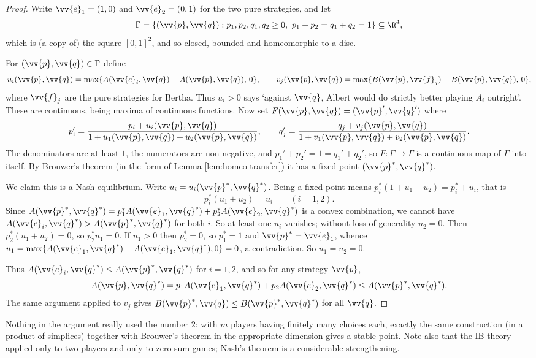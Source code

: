 \begin{proof}
	Write $\vv{e}_1 = (1,0)$ and $\vv{e}_2 = (0,1)$ for the two pure strategies, and let
	$$\Gamma = \{(\vv{p},\vv{q}) : p_1,p_2,q_1,q_2\geq 0,\ p_1+p_2 = q_1+q_2 = 1\} \subseteq \R^4,$$
	which is (a copy of) the square $[0,1]^2$, and so closed, bounded and homeomorphic to a disc.

	For $(\vv{p},\vv{q}) \in \Gamma$ define
	$$u_i(\vv{p},\vv{q}) = \max\{A(\vv{e}_i,\vv{q}) - A(\vv{p},\vv{q}),\, 0\}, \qquad v_j(\vv{p},\vv{q}) = \max\{B(\vv{p},\vv{f}_j)-B(\vv{p},\vv{q}),\,0\},$$
	where $\vv{f}_j$ are the pure strategies for Bertha. Thus $u_i > 0$ says `against $\vv{q}$, Albert would do strictly better playing $A_i$ outright'. These are continuous, being maxima of continuous functions. Now set $F(\vv{p},\vv{q}) = (\vv{p}',\vv{q}')$ where
	$$p_i' = \frac{p_i + u_i(\vv{p},\vv{q})}{1+u_1(\vv{p},\vv{q})+u_2(\vv{p},\vv{q})}, \qquad q_j' = \frac{q_j+v_j(\vv{p},\vv{q})}{1+v_1(\vv{p},\vv{q})+v_2(\vv{p},\vv{q})}.$$
	The denominators are at least $1$, the numerators are non-negative, and $p_1'+p_2' = 1 = q_1'+q_2'$, so $F : \Gamma \to \Gamma$ is a continuous map of $\Gamma$ into itself. By Brouwer's theorem (in the form of Lemma \ref{lem:homeo-transfer}) it has a fixed point $(\vv{p}^*,\vv{q}^*)$.

	We claim this is a Nash equilibrium. Write $u_i = u_i(\vv{p}^*,\vv{q}^*)$. Being a fixed point means $p_i^*(1+u_1+u_2) = p_i^* + u_i$, that is
	$$p_i^*(u_1+u_2) = u_i \qquad (i=1,2).$$
	Since $A(\vv{p}^*,\vv{q}^*) = p_1^*A(\vv{e}_1,\vv{q}^*)+p_2^*A(\vv{e}_2,\vv{q}^*)$ is a convex combination, we cannot have $A(\vv{e}_i,\vv{q}^*)>A(\vv{p}^*,\vv{q}^*)$ for both $i$. So at least one $u_i$ vanishes; without loss of generality $u_2 = 0$. Then $p_2^*(u_1+u_2) = 0$, so $p_2^*u_1 = 0$. If $u_1 > 0$ then $p_2^* = 0$, so $p_1^*=1$ and $\vv{p}^* = \vv{e}_1$, whence $u_1 = \max\{A(\vv{e}_1,\vv{q}^*)-A(\vv{e}_1,\vv{q}^*),0\} = 0$, a contradiction. So $u_1 = u_2 = 0$.

	Thus $A(\vv{e}_i,\vv{q}^*)\leq A(\vv{p}^*,\vv{q}^*)$ for $i=1,2$, and so for any strategy $\vv{p}$,
	$$A(\vv{p},\vv{q}^*) = p_1A(\vv{e}_1,\vv{q}^*)+p_2A(\vv{e}_2,\vv{q}^*) \leq A(\vv{p}^*,\vv{q}^*).$$
	The same argument applied to $v_j$ gives $B(\vv{p}^*,\vv{q})\leq B(\vv{p}^*,\vv{q}^*)$ for all $\vv{q}$.
\end{proof}

Nothing in the argument really used the number $2$: with $m$ players having finitely many choices each, exactly the same construction (in a product of simplices) together with Brouwer's theorem in the appropriate dimension gives a stable point. Note also that the IB theory applied only to two players and only to zero-sum games; Nash's theorem is a considerable strengthening.


